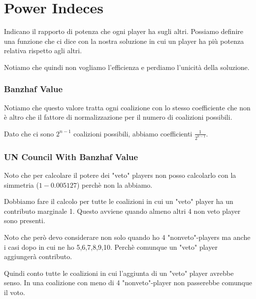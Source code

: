 \documentclass[10pt,a4paper]{report}
\begin{document}
        \section{Power Indeces}

        Indicano il rapporto di potenza che ogni player ha sugli altri. Possiamo definire una funzione che ci dice con la nostra soluzione in cui un player ha più potenza relativa rispetto agli altri.

        Notiamo che quindi non vogliamo l'efficienza e perdiamo l'unicità della soluzione.

        \subsubsection{Banzhaf Value}

        Notiamo che questo valore tratta ogni coalizione con lo stesso coefficiente che non è altro che il fattore di normalizzazione per il numero di coalizioni possibili.

        Dato che ci sono $2^{n-1}$ coalizioni possibili, abbiamo coefficienti $\frac{1}{2^{n-1}}$.

        \subsubsection{UN Council With Banzhaf Value}

        Noto che per calcolare il potere dei "veto" players non posso calcolarlo con la simmetria ($1-0.005127$) perchè non la abbiamo.

        Dobbiamo fare il calcolo per tutte le coalizioni in cui un "veto" player ha un contributo marginale 1. Questo avviene quando almeno altri 4 non veto player sono presenti.

        Noto che però devo considerare non solo quando ho 4 "nonveto"-players ma anche i casi dopo in cui ne ho 5,6,7,8,9,10. Perchè comunque un "veto" player aggiungerà contributo.

        Quindi conto tutte le coalizioni in cui l'aggiunta di un "veto" player avrebbe senso. In una coalizione con meno di 4 "nonveto"-player non passerebbe comunque il voto.
\end{document}
